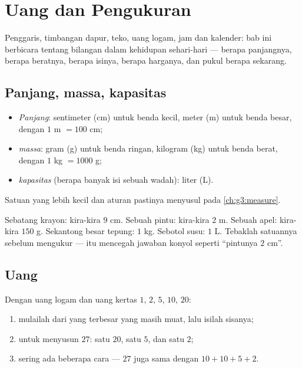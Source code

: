 \chapter{Uang dan Pengukuran}\label{ch:g2:measure}

Penggaris, timbangan dapur, teko, uang logam, jam dan kalender: bab
ini berbicara tentang bilangan dalam kehidupan sehari-hari ---
berapa panjangnya, berapa beratnya, berapa isinya, berapa harganya,
dan pukul berapa sekarang.

\section{Panjang, massa, kapasitas}

\begin{definition}\label{def:g2:measure:units}
\begin{itemize}
  \item \emph{Panjang}: sentimeter (cm) untuk benda kecil, meter (m)
        untuk benda besar, dengan $1$ m $= 100$ cm;
  \item \emph{massa}: gram (g) untuk benda ringan, kilogram (kg)
        untuk benda berat, dengan $1$ kg $= 1000$ g;
  \item \emph{kapasitas} (berapa banyak isi sebuah wadah): liter (L).
\end{itemize}
Satuan yang lebih kecil dan aturan pastinya menyusul pada \cref{ch:g3:measure}.
\end{definition}

\begin{example}\label{ex:g2:measure:choose}
Sebatang krayon: kira-kira $9$ cm. Sebuah pintu: kira-kira $2$ m.
Sebuah apel: kira-kira $150$ g. Sekantong besar tepung: $1$ kg.
Sebotol susu: $1$ L. Tebaklah satuannya sebelum mengukur --- itu
mencegah jawaban konyol seperti ``pintunya $2$ cm''.
\end{example}

\section{Uang}

\begin{method}\label{met:g2:measure:money}
Dengan uang logam dan uang kertas $1$, $2$, $5$, $10$, $20$:
\begin{enumerate}
  \item mulailah dari yang terbesar yang masih muat, lalu isilah
        sisanya;
  \item untuk menyusun $27$: satu $20$, satu $5$, dan satu $2$;
  \item sering ada beberapa cara --- $27$ juga sama dengan
        $10 + 10 + 5 + 2$.
\end{enumerate}
\end{method}

